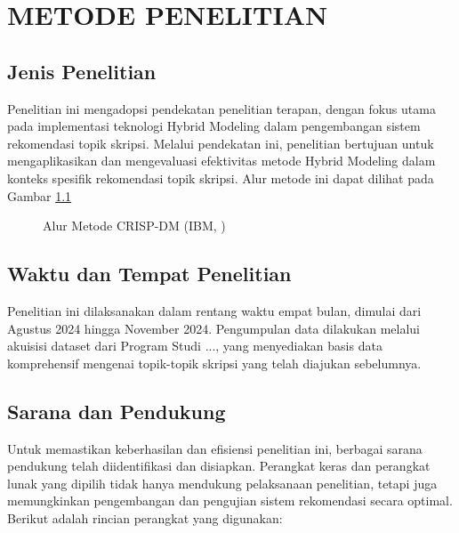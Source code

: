 \chapter{METODE PENELITIAN}

\section{Jenis Penelitian}
Penelitian ini mengadopsi pendekatan penelitian terapan, dengan fokus utama pada implementasi teknologi Hybrid Modeling dalam pengembangan sistem rekomendasi topik skripsi. Melalui pendekatan ini, penelitian bertujuan untuk mengaplikasikan dan mengevaluasi efektivitas metode Hybrid Modeling dalam konteks spesifik rekomendasi topik skripsi. Alur metode ini dapat dilihat pada Gambar \ref{fig:crisp-dm-overview}

\begin{figure}[H]
    \centering
    \caption{Alur Metode CRISP-DM (IBM, \cite{IBM2022})}
    \label{fig:crisp-dm-overview}
\end{figure}

\section{Waktu dan Tempat Penelitian}
Penelitian ini dilaksanakan dalam rentang waktu empat bulan, dimulai dari Agustus 2024 hingga November 2024. Pengumpulan data dilakukan melalui akuisisi dataset dari Program Studi ..., yang menyediakan basis data komprehensif mengenai topik-topik skripsi yang telah diajukan sebelumnya.

\section{Sarana dan Pendukung}
Untuk memastikan keberhasilan dan efisiensi penelitian ini, berbagai sarana pendukung telah diidentifikasi dan disiapkan. Perangkat keras dan perangkat lunak yang dipilih tidak hanya mendukung pelaksanaan penelitian, tetapi juga memungkinkan pengembangan dan pengujian sistem rekomendasi secara optimal. Berikut adalah rincian perangkat yang digunakan:

